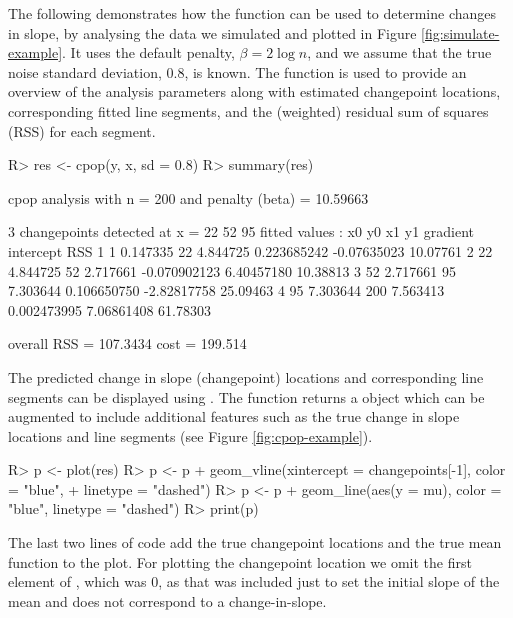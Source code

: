 \documentclass[nojss]{jss}
\begin{document}
The following demonstrates how the  function can be used to determine changes in slope, by analysing the data we simulated and plotted in Figure \ref{fig:simulate-example}. It uses the default penalty, $\beta=2\log n$, and we assume that the true noise standard deviation, 0.8, is known. The  function is used to provide an overview of the analysis parameters along with estimated changepoint locations, corresponding fitted line segments, and the (weighted) residual sum of squares (RSS) for each segment. 
%
%
\begin{CodeChunk}
\begin{CodeInput}
R> res <- cpop(y, x, sd = 0.8)
R> summary(res)
\end{CodeInput}
\begin{CodeOutput}
cpop analysis with n = 200 and penalty (beta)  = 10.59663

3  changepoints detected at x = 
 22 52 95
fitted values : 
  x0       y0  x1       y1     gradient   intercept      RSS
1  1 0.147335  22 4.844725  0.223685242 -0.07635023 10.07761
2 22 4.844725  52 2.717661 -0.070902123  6.40457180 10.38813
3 52 2.717661  95 7.303644  0.106650750 -2.82817758 25.09463
4 95 7.303644 200 7.563413  0.002473995  7.06861408 61.78303

overall RSS = 107.3434
cost = 199.514
\end{CodeOutput}
\end{CodeChunk}
%
%
The predicted change in slope (changepoint) locations and corresponding line segments can be displayed using . The  function returns a  object which can be augmented to include additional features such as the true change in slope locations and line segments (see Figure \ref{fig:cpop-example}).
%
%
\begin{CodeChunk}
\begin{CodeInput}
R> p <- plot(res)
R> p <- p + geom_vline(xintercept = changepoints[-1], color = "blue",
+                   linetype = "dashed")
R> p <- p + geom_line(aes(y = mu), color = "blue", linetype = "dashed")
R> print(p)
\end{CodeInput}
\end{CodeChunk}
The last two lines of code add the true changepoint locations and the true mean function to the plot. For plotting the changepoint location we omit the first element of , which was 0, as that was included just to set the initial slope of the mean and does not correspond to a change-in-slope.
\end{document}
